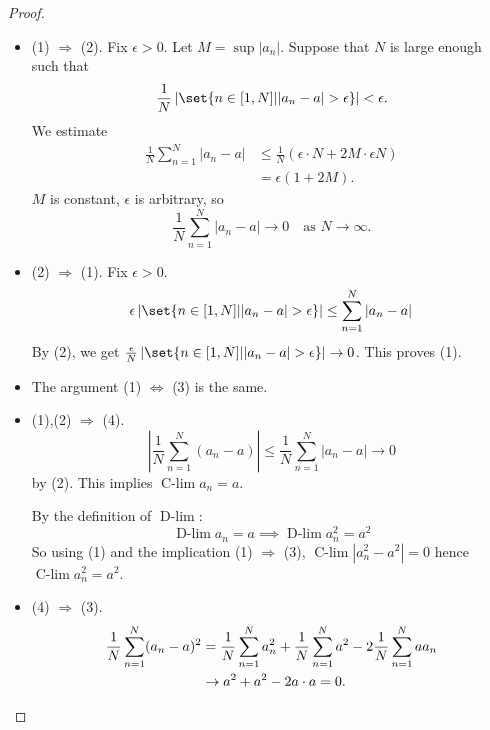 \documentclass{article}
\DeclareMathOperator*{\dlim}{D-lim}
\DeclareMathOperator*{\clim}{C-lim}
\begin{document}
\begin{proof}\leavevmode
  \begin{itemize}
    \item (1) $\Rightarrow$ (2). Fix $\epsilon > 0$. Let $M = \sup |a_n|$. Suppose that $N$ is large enough such that
      \begin{equation*}
        \frac{1}{N} \left\lvert\set{n \in [1,N] | |a_n - a| > \epsilon}\right\rvert < \epsilon.
      \end{equation*}
      We estimate
      \begin{align*}
        \frac{1}{N} \sum_{n=1}^N |a_n - a| &\leq \frac{1}{N} (\epsilon \cdot N + 2M \cdot \epsilon N) \\
                                           &= \epsilon(1 + 2M).
      \end{align*}
      $M$ is constant, $\epsilon$ is arbitrary, so
      \begin{equation*}
        \frac{1}{N} \sum_{n=1}^N |a_n - a| \to 0 \quad \text{as } N \to \infty.
      \end{equation*}

    \item (2) $\Rightarrow$ (1). Fix $\epsilon > 0$.
      \begin{equation*}
        \epsilon \left\lvert\set{n \in [1,N] | |a_n - a| > \epsilon}\right\rvert \leq \sum_{n=1}^N |a_n - a|
      \end{equation*}
      By (2), we get $\frac{\epsilon}{N} \left\lvert\set{n \in [1,N] | |a_n - a| > \epsilon}\right\rvert \to 0$.
      This proves (1).

    \item The argument (1) $\Leftrightarrow$ (3) is the same.

    \item (1),(2) $\Rightarrow$ (4).
      \begin{equation*}
        \left| \frac{1}{N} \sum_{n=1}^N (a_n - a) \right| \leq \frac{1}{N} \sum_{n=1}^N |a_n - a| \to 0
      \end{equation*}
      by (2). This implies $\clim a_n = a$.

      By the definition of $\dlim$:
      \begin{equation*}
        \dlim a_n = a \implies \dlim a_n^2 = a^2
      \end{equation*}
      So using (1) and the implication (1) $\Rightarrow$ (3), $\clim |a_n^2 - a^2| = 0$ hence $\clim a_n^2 = a^2$.

    \item (4) $\Rightarrow$ (3).
      \begin{align*}
        \frac{1}{N} \sum_{n=1}^N (a_n - a)^2 &= \frac{1}{N} \sum_{n=1}^N a_n^2 + \frac{1}{N} \sum_{n=1}^N a^2 - 2 \frac{1}{N} \sum_{n=1}^N a a_n \\
                                             &\to a^2 + a^2 - 2a \cdot a = 0. \qedhere
      \end{align*}
  \end{itemize}
\end{proof}
\end{document}
